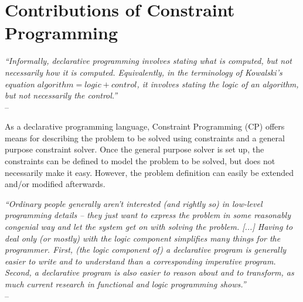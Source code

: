 \section{Contributions of Constraint Programming}
\hspace{-\marginparwidth}
\begin{minipage}{.8\largefigure}
\begin{flushright}{\slshape
	``Informally, declarative programming involves stating \emph{what} is computed, but not necessarily \emph{how} it is computed. Equivalently, in the terminology of Kowalski's equation $algorithm = logic + control$, it involves stating the \emph{logic} of an algorithm, but not necessarily the \emph{control}.''} \\ \medskip
-- \cite{LloydDeclarative}
\end{flushright}
\end{minipage}
%

As a declarative programming language, Constraint Programming (CP) offers means for describing the problem to be solved using constraints and a general purpose constraint solver. Once the general purpose solver is set up, the constraints can be defined to model the problem to be solved, but does not necessarily make it easy. However, the problem definition can easily be extended and/or modified afterwards.

\hspace{-\marginparwidth}
\begin{minipage}{.8\largefigure}
\begin{flushright}{\slshape
	``Ordinary people generally aren't interested (and rightly so) in low-level programming details -- they just want to express the problem in some reasonably congenial way and let the system get on with solving the problem. [...] Having to deal only (or mostly) with the logic component simplifies many things for the programmer. First, (the logic component of) a declarative program is generally easier to write and to understand than a corresponding imperative program. Second, a declarative program is also easier to reason about and to transform, as much current research in functional and logic programming shows.''} \\ \medskip
-- \cite{LloydDeclarative}
\end{flushright}
\end{minipage}

